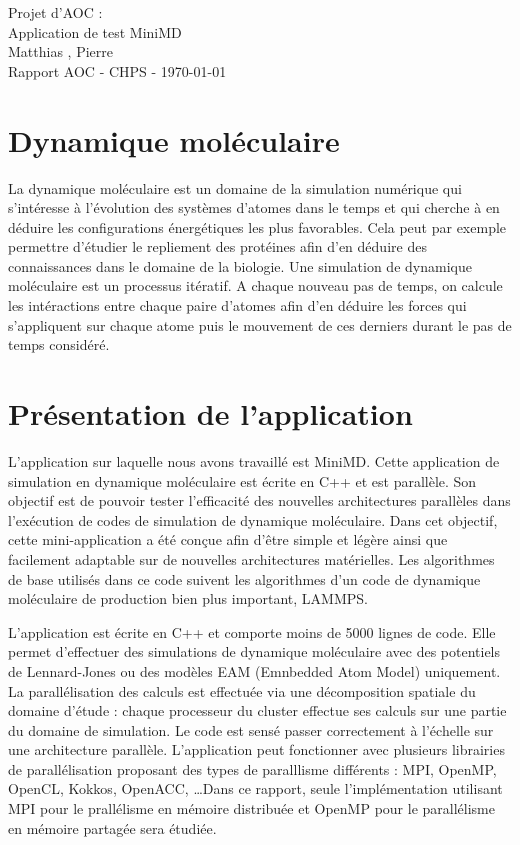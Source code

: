 \documentclass[11pt,a4paper]{article}
\begin{document}
\begin{center}

	{\LARGE\centering Projet d'AOC :\\ Application de test MiniMD}\\[1cm]

	{ Matthias , Pierre }\\[0.5cm]
	{Rapport AOC - CHPS - \today}\\[2cm]
\end{center}

\tableofcontents
\newpage

\section{Dynamique moléculaire}
	La dynamique moléculaire est un domaine de la simulation numérique qui s'intéresse à l'évolution des systèmes d'atomes dans le temps et qui cherche à en déduire les configurations énergétiques les plus favorables. Cela peut par exemple permettre d'étudier le repliement des protéines afin d'en déduire des connaissances dans le domaine de la biologie.
	Une simulation de dynamique moléculaire est un processus itératif. A chaque nouveau pas de temps, on calcule les intéractions entre chaque paire d'atomes afin d'en déduire les forces qui s'appliquent sur chaque atome puis le mouvement de ces derniers durant le pas de temps considéré.

\section{Présentation de l'application}
	L'application sur laquelle nous avons travaillé est MiniMD. Cette application de simulation en dynamique moléculaire est écrite en C++ et est parallèle. Son objectif est de pouvoir tester l'efficacité des nouvelles architectures parallèles dans l'exécution de codes de simulation de dynamique moléculaire. Dans cet objectif, cette mini-application a été conçue afin d'être simple et légère ainsi que facilement adaptable sur de nouvelles architectures matérielles. Les algorithmes de base utilisés dans ce code suivent les algorithmes d'un code de dynamique moléculaire de production bien plus important, LAMMPS.

	L'application est écrite en C++ et comporte moins de 5000 lignes de code. Elle permet d'effectuer des simulations de dynamique moléculaire avec des potentiels de Lennard-Jones ou des modèles EAM (Emnbedded Atom Model) uniquement. La parallélisation des calculs est effectuée via une décomposition spatiale du domaine d'étude : chaque processeur du cluster effectue ses calculs sur une partie du domaine de simulation. Le code est sensé passer correctement à l'échelle  sur une architecture parallèle. L'application peut fonctionner avec plusieurs librairies de parallélisation proposant des types de paralllisme différents : MPI, OpenMP, OpenCL, Kokkos, OpenACC, \ldots Dans ce rapport, seule l'implémentation utilisant MPI pour le prallélisme en mémoire distribuée et OpenMP pour le parallélisme en mémoire partagée sera étudiée.
\end{document}

